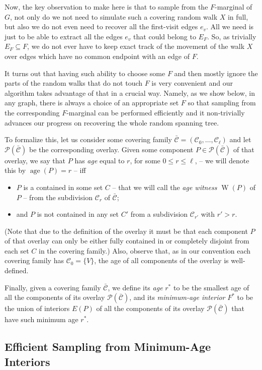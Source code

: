\documentclass[11pt, letterpaper]{article}
\DeclareMathOperator{\age}{age}
\newcommand{\cC}{\mathcal{C}}
\newcommand{\ocC}{\bar{\mathcal{C}}}
\newcommand{\cP}{\mathcal{P}}
\newcommand{\wit}[1]{\mathop{W}(#1)}
\begin{document}
Now, the key observation to make here is that to sample from the $F$-marginal of $G$, not only do we not need to simulate such a covering random walk $X$ in full, but also we do not even need to recover all the first-visit edges $e_v$. All we need is just to be able to extract all the edges $e_v$ that could belong to $E_F$. So, as trivially $E_F\subseteq F$, we do not ever have to keep exact track of the movement of the walk $X$ over edges which have no common endpoint with an edge of $F$.

It turns out that having such ability to choose some $F$ and then mostly ignore the parts of the random walks that do not touch $F$ is very convenient and our algorithm takes advantage of that in a crucial way. Namely, as we show below, in any graph, there is always a choice of an appropriate set $F$ so that sampling from the corresponding $F$-marginal can be performed efficiently and it non-trivially advances our progress on recovering the whole random spanning tree.

To formalize this, let us consider some covering family $\ocC=(\cC_0,\ldots, \cC_{\ell})$ and let $\cP(\ocC)$ be the corresponding overlay. Given some component $P\in \cP(\ocC)$ of that overlay, we say that $P$ has {\em age} equal to $r$, for some $0\leq r\leq \ell$, -- we will denote this by $\age(P)=r$ -- iff
\begin{itemize}\addtolength{\itemsep}{-.5\baselineskip}
\item $P$ is a contained in some set $C$ -- that we will call the {\em age witness $\wit{P}$} of $P$ -- from the subdivision $\cC_r$ of $\ocC$;
\item and $P$ is not contained in any set $C'$ from a subdivision $\cC_{r'}$ with $r'>r$.
\end{itemize}
(Note that due to the definition of the overlay it must be that each component $P$ of that overlay can only be either fully contained in or completely disjoint from each set $C$ in the covering family.) Also, observe that, as in our convention each covering family has $\cC_0=\{V\}$, the age of all components of the overlay is well-defined. 

Finally, given a covering family $\ocC$, we define its {\em age} $r^*$ to be the smallest age of all the components of its overlay $\cP(\ocC)$, and its {\em minimum-age interior} $F^*$ to be the union of interiors $E(P)$ of all the components of its overlay $\cP(\ocC)$ that have such minimum age $r^*$.  

\subsection{Efficient Sampling from Minimum-Age Interiors}
\end{document}
